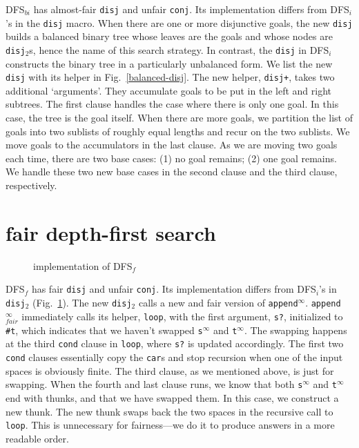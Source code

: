 \documentclass[acmlarge]{acmart}
\newcommand{\conj}{\texttt{conj}}
\newcommand{\disj}{\texttt{disj}}
\newcommand{\disjtwo}{\texttt{disj$_2$}}
\newcommand{\appendInf}{\texttt{append$^\infty$}}
\newcommand{\appendInfFair}{\texttt{append$^\infty_{fair}$}}
\newcommand{\sInf}{\texttt{s$^\infty$}}
\newcommand{\tInf}{\texttt{t$^\infty$}}
\newcommand{\DFSi }[0]{DFS$_{i}$}
\newcommand{\DFSf }[0]{DFS$_{f}$}
\newcommand{\DFSbi}[0]{DFS$_{bi}$}
\begin{document}
\DFSbi{} has almost-fair \disj{} and unfair \conj{}. Its 
implementation differs from 
\DFSi{}'s in the \disj{} macro. When there are one or more disjunctive 
goals, the new \disj{} builds a balanced binary tree whose leaves are the goals 
and 
whose nodes are \disjtwo{}s, hence the name of this search strategy. 
In contrast, the \disj{} in \DFSi{} constructs the binary tree in a 
particularly unbalanced form.
We list the new \disj{} with its helper in Fig.~\ref{balanced-disj}.
The new helper, \texttt{disj+}, takes two additional `arguments'. They 
accumulate goals to be put in the left and right subtrees. The first clause 
handles the case where there is only one goal. In this case, the tree is the 
goal itself. When there are more goals, we partition the list of goals 
into two sublists of roughly equal lengths and recur on the two sublists. We 
move goals to the accumulators in the last clause. As we are moving 
two goals each time, there are two base cases: (1) no goal remains; (2) one 
goal remains. We handle these two new base cases in the second clause and the 
third clause, respectively. 

\section{fair depth-first search}

\begin{figure}
	
	\caption{implementation of \DFSf{}}
	\label{fDFS}
\end{figure}

\DFSf{} has fair \disj{} and unfair \conj{}. Its 
implementation differs from \DFSi{}'s in 
\disjtwo{} (Fig.~\ref{fDFS}). The new \disjtwo{} calls a new and 
fair version of \appendInf{}. \appendInfFair{} 
immediately 
calls 
its helper, \texttt{loop}, with the first argument, \texttt{s?}, initialized to 
\texttt{\#{}t}, which indicates that we haven't swapped
\sInf{} and \tInf{}. The swapping 
happens at 
the third \texttt{cond} clause in \texttt{loop}, where \texttt{s?} is updated 
accordingly. The first two \texttt{cond} clauses essentially copy the 
\texttt{car}s and stop recursion when one of the input spaces is obviously 
finite. The third clause, as we mentioned above, is just for swapping. When the 
fourth and last clause runs, we know that both \sInf{} and 
\tInf{} end with thunks, and that we have swapped them. In 
this case, we construct a new thunk. The new thunk swaps back the two spaces in 
the
recursive call to \texttt{loop}. This is unnecessary for fairness---we do it to 
produce answers in a more readable order.
\end{document}
